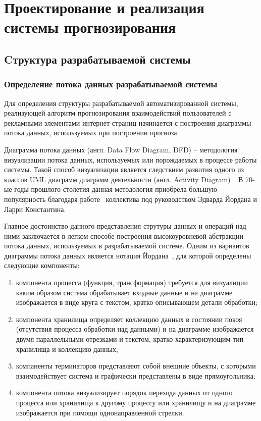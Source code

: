 \section{Проектирование и реализация системы прогнозирования}
\subsection{Cтруктура разрабатываемой системы}
\subsubsection{Определение потока данных разрабатываемой системы}
Для определения структуры разрабатываемой автоматизированной системы, реализующей алгоритм прогнозирования взаимодействий
пользователей с рекламными элементами интернет-страниц начинается с построения диаграммы потока данных, используемых при
построении прогноза.

Диаграмма потока данных (англ. Data Flow Diagram, DFD) -- методология визуализации потока данных, используемых или
порождаемых в процессе работы системы. Такой способ визуализации является следствием развития одного из классов UML диаграмм
диаграмм деятельности (англ. Activity Diagram)~\autocite{impl:ad}. В 70-ые годы прошлого столетия данная методология
приобрела большую популярность благодаря работе~\autocite{impl:dfd} коллектива под руководством Эдварда Йордана и
Ларри Константина.

Главное достоинство данного представления струтуры данных и операций над ними заключается в легком способе построения высокоуровневой
абстракции потока данных, используемых в разрабатываемой системе. Одним из вариантов диаграммы потока данных является нотация 
Йордана~\autocite{impl:yourdan}, для которой определены следующие компоненты:
\begin{enumerate}
    \item компонента процесса (функция, трансформация) требуется для визуалиции каким образом система обрабатывает 
    входные данные и на диаграмме изображается в виде круга с текстом, кратко описывающем детали обработки;
    \item компонента хранилища определяет коллекцию данных в состоянии покоя (отсутствия процесса обработки над данными) и
    на диаграмме изображается двумя параллельными отрезками и текстом, кратко характеризующим тип хранилища и
    коллекцию данных; 
    \item компаненты терминаторов представляют собой внешние объекты, с которыми взаимодействует система и графически представлены
    в виде прямоугольника;
    \item компонента потока визуализирует порядок перехода данных от одного процесса или хранилища к другому процессу или
    хранилищу и на диаграмме изображается при помощи однонаправленной стрелки.
\end{enumerate}

